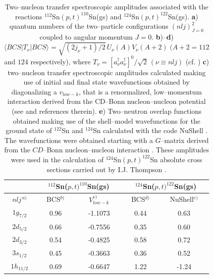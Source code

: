  \begin{table}[h!]
 {\begin{tabular}{|c|c|c|c|c|}
 \cline{2-5} 
 \multicolumn{1}{c|}{ }& \multicolumn{2}{|c|}{ $^{112}$Sn($p,t)^{110}$Sn(gs)}&\multicolumn{2}{|c|}{$^{124}$Sn($p,t)^{122}$Sn(gs)} \\
 \hline
 $nlj^{\,a)}$ & BCS$^{b)}$ & $V_{low-k}^{c)}$ & BCS$^{d)}$& NuShell$^{e)}$  \\
 \hline
 $1g_{7/2}$ & 0.96 &-1.1073 & 0.44 & 0.63  \\
 $2d_{5/2}$ & 0.66 & -0.7556& 0.35 & 0.60  \\
 $2d_{3/2}$ & 0.54 &  -0.4825& 0.58 & 0.72  \\
 $3s_{1/2}$ & 0.45 &  -0.3663&  0.36 & 0.52  \\
 $1h_{11/2}$ & 0.69 & -0.6647 & 1.22 & -1.24  \\
 \hline 
 \end{tabular}}
 \caption{Two--nucleon transfer spectroscopic amplitudes associated with the reactions $^{112}$Sn$(p,t)^{110}$Sn(gs) and $^{124}$Sn$(p,t)^{122}$Sn(gs). \textbf{a}) quantum numbers of the two--particle configurations $(nlj)^2_{J=0}$ coupled to angular momentum $J=0$. \textbf{b})--\textbf{d}) $\langle BCS|T_\nu|BCS\rangle=\sqrt{(2j_\nu+1)/2}\,U_\nu(A) V_\nu(A+2)\;(A+2=112$ and $ 124$ respectively), where $T_\nu=[a^\dagger_{\nu}a^\dagger_\nu]^0/\sqrt{2} \,(\nu\equiv nlj)$ (cf. \cite{Potel:11,Potel:13,Potel:13b}) \textbf{c}) two--nucleon transfer spectroscopic amplitudes calculated making use of initial and final state wavefunctions obtained by diagonalizing a $v_{low-k}$, that is a renormalized, low--momentum interaction derived from the CD--Bonn nucleon--nucleon potential (see \cite{Guazzoni:06} and references therein). \textbf{e}) Two--neutron overlap functions obtained making use of the shell--model wavefunctions for the ground state of $^{122}$Sn and $^{124}$Sn calculated with the code NuShell \citep{Brown:07}. The wavefunctions were obtained starting with a $G$--matrix derived from the $CD$--Bonn nucleon--nucleon interaction \cite{Machleidt:96}. These amplitudes were used in the calculation of $^{124}$Sn$(p,t)^{122}$Sn absolute cross sections carried out by I.J. Thompson \citep{Thompson:13}.}\label{tab1D1}
 \end{table}
